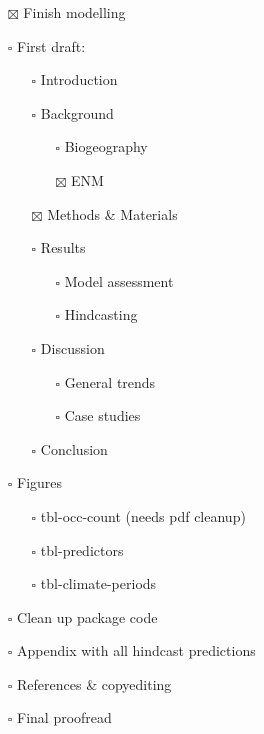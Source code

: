 \documentclass[
  authoryear,
  review]{elsarticle}
\providecommand{\tightlist}{%
  \setlength{\itemsep}{0pt}\setlength{\parskip}{0pt}}\usepackage{longtable,booktabs,array}
\begin{document}
\begin{itemize}
\tightlist
\item[$\boxtimes$]
  Finish modelling
\item[$\square$]
  First draft:

  \begin{itemize}
  \tightlist
  \item[$\square$]
    Introduction
  \item[$\square$]
    Background

    \begin{itemize}
    \tightlist
    \item[$\square$]
      Biogeography
    \item[$\boxtimes$]
      ENM
    \end{itemize}
  \item[$\boxtimes$]
    Methods \& Materials
  \item[$\square$]
    Results

    \begin{itemize}
    \tightlist
    \item[$\square$]
      Model assessment
    \item[$\square$]
      Hindcasting
    \end{itemize}
  \item[$\square$]
    Discussion

    \begin{itemize}
    \tightlist
    \item[$\square$]
      General trends
    \item[$\square$]
      Case studies
    \end{itemize}
  \item[$\square$]
    Conclusion
  \end{itemize}
\item[$\square$]
  Figures

  \begin{itemize}
  \tightlist
  \item[$\square$]
    tbl-occ-count (needs pdf cleanup)
  \item[$\square$]
    tbl-predictors
  \item[$\square$]
    tbl-climate-periods
  \end{itemize}
\item[$\square$]
  Clean up package code
\item[$\square$]
  Appendix with all hindcast predictions
\item[$\square$]
  References \& copyediting
\item[$\square$]
  Final proofread
\end{itemize}
\end{document}
